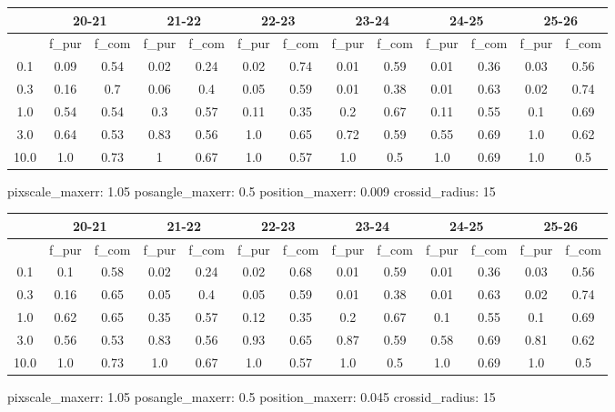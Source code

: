 \documentclass{article}
\begin{document}
\begin{figure}[H]
\centering
\begin{tabular}{|c|c|c|c|c|c|c|c|c|c|c|c|c|}
\hline
\multicolumn{1}{|c|}{} & \multicolumn{2}{|c|}{20-21} & \multicolumn{2}{|c|}{21-22} & \multicolumn{2}{|c|}{22-23} & \multicolumn{2}{|c|}{23-24} & \multicolumn{2}{|c|}{24-25} & \multicolumn{2}{|c|}{25-26}\\
\hline \hline
 & f\_pur & f\_com & f\_pur & f\_com & f\_pur & f\_com & f\_pur & f\_com & f\_pur & f\_com & f\_pur & f\_com \\
\hline
0.1 & 0.09 & 0.54 & 0.02 & 0.24 & 0.02 & 0.74 & 0.01 & 0.59 & 0.01 & 0.36 & 0.03 & 0.56\\
\hline
0.3 & 0.16 & 0.7 & 0.06 & 0.4 & 0.05 & 0.59 & 0.01 & 0.38 & 0.01 & 0.63 & 0.02 & 0.74\\
\hline
1.0 & 0.54 & 0.54 & 0.3 & 0.57 & 0.11 & 0.35 & 0.2 & 0.67 & 0.11 & 0.55 & 0.1 & 0.69\\
\hline
3.0 & 0.64 & 0.53 & 0.83 & 0.56 & 1.0 & 0.65 & 0.72 & 0.59 & 0.55 & 0.69 & 1.0 & 0.62\\
\hline
10.0 & 1.0 & 0.73 & 1 & 0.67 & 1.0 & 0.57 & 1.0 & 0.5 & 1.0 & 0.69 & 1.0 & 0.5\\
\hline
\end{tabular}
\caption{pixscale\_maxerr: 1.05 posangle\_maxerr: 0.5 position\_maxerr: 0.009 crossid\_radius: 15}
\end{figure}

\begin{figure}[H]
\centering
\begin{tabular}{|c|c|c|c|c|c|c|c|c|c|c|c|c|}
\hline
\multicolumn{1}{|c|}{} & \multicolumn{2}{|c|}{20-21} & \multicolumn{2}{|c|}{21-22} & \multicolumn{2}{|c|}{22-23} & \multicolumn{2}{|c|}{23-24} & \multicolumn{2}{|c|}{24-25} & \multicolumn{2}{|c|}{25-26}\\
\hline \hline
 & f\_pur & f\_com & f\_pur & f\_com & f\_pur & f\_com & f\_pur & f\_com & f\_pur & f\_com & f\_pur & f\_com \\
\hline
0.1 & 0.1 & 0.58 & 0.02 & 0.24 & 0.02 & 0.68 & 0.01 & 0.59 & 0.01 & 0.36 & 0.03 & 0.56\\
\hline
0.3 & 0.16 & 0.65 & 0.05 & 0.4 & 0.05 & 0.59 & 0.01 & 0.38 & 0.01 & 0.63 & 0.02 & 0.74\\
\hline
1.0 & 0.62 & 0.65 & 0.35 & 0.57 & 0.12 & 0.35 & 0.2 & 0.67 & 0.1 & 0.55 & 0.1 & 0.69\\
\hline
3.0 & 0.56 & 0.53 & 0.83 & 0.56 & 0.93 & 0.65 & 0.87 & 0.59 & 0.58 & 0.69 & 0.81 & 0.62\\
\hline
10.0 & 1.0 & 0.73 & 1.0 & 0.67 & 1.0 & 0.57 & 1.0 & 0.5 & 1.0 & 0.69 & 1.0 & 0.5\\
\hline
\end{tabular}
\caption{pixscale\_maxerr: 1.05 posangle\_maxerr: 0.5 position\_maxerr: 0.045 crossid\_radius: 15}
\end{figure}
\end{document}

